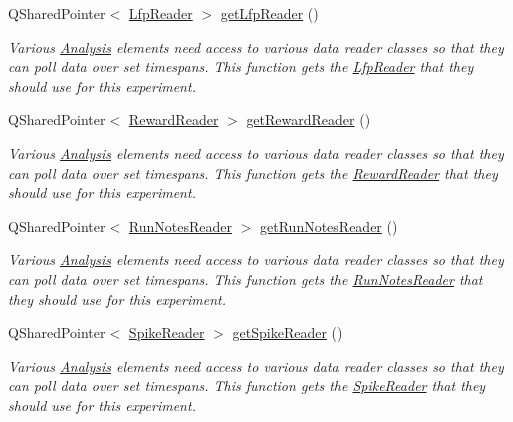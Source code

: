 \begin{DoxyCompactItemize}
Q\-Shared\-Pointer$<$ \hyperlink{class_picto_1_1_lfp_reader}{Lfp\-Reader} $>$ \hyperlink{class_picto_1_1_design_config_adaa57c362553b48a8e849d346ac55e1a}{get\-Lfp\-Reader} ()
\begin{DoxyCompactList}\small\item\em Various \hyperlink{class_picto_1_1_analysis}{Analysis} elements need access to various data reader classes so that they can poll data over set timespans. This function gets the \hyperlink{class_picto_1_1_lfp_reader}{Lfp\-Reader} that they should use for this experiment. \end{DoxyCompactList}\item 
Q\-Shared\-Pointer$<$ \hyperlink{class_picto_1_1_reward_reader}{Reward\-Reader} $>$ \hyperlink{class_picto_1_1_design_config_a68b34648e8f8b9980b8463ca6c68ddf9}{get\-Reward\-Reader} ()
\begin{DoxyCompactList}\small\item\em Various \hyperlink{class_picto_1_1_analysis}{Analysis} elements need access to various data reader classes so that they can poll data over set timespans. This function gets the \hyperlink{class_picto_1_1_reward_reader}{Reward\-Reader} that they should use for this experiment. \end{DoxyCompactList}\item 
Q\-Shared\-Pointer$<$ \hyperlink{class_picto_1_1_run_notes_reader}{Run\-Notes\-Reader} $>$ \hyperlink{class_picto_1_1_design_config_a4f5534007f087af97c70b425c3fc1111}{get\-Run\-Notes\-Reader} ()
\begin{DoxyCompactList}\small\item\em Various \hyperlink{class_picto_1_1_analysis}{Analysis} elements need access to various data reader classes so that they can poll data over set timespans. This function gets the \hyperlink{class_picto_1_1_run_notes_reader}{Run\-Notes\-Reader} that they should use for this experiment. \end{DoxyCompactList}\item 
Q\-Shared\-Pointer$<$ \hyperlink{class_picto_1_1_spike_reader}{Spike\-Reader} $>$ \hyperlink{class_picto_1_1_design_config_adbbef0cf54aed619659f7690924fea27}{get\-Spike\-Reader} ()
\begin{DoxyCompactList}\small\item\em Various \hyperlink{class_picto_1_1_analysis}{Analysis} elements need access to various data reader classes so that they can poll data over set timespans. This function gets the \hyperlink{class_picto_1_1_spike_reader}{Spike\-Reader} that they should use for this experiment. \end{DoxyCompactList}\item 

\end{DoxyCompactItemize}
